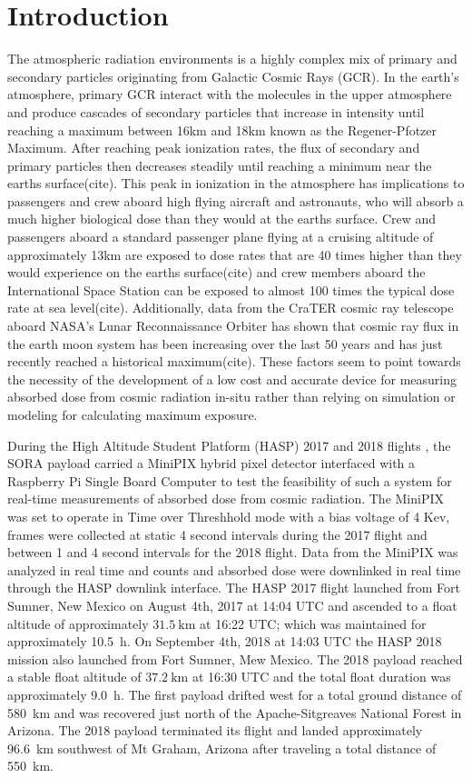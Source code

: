 \section{Introduction}
\label{Introduction}
The atmospheric radiation environments is a highly complex mix of primary and secondary particles originating from Galactic Cosmic Rays (GCR). In the earth’s atmosphere, primary GCR interact with the molecules in the upper atmosphere and produce cascades of secondary particles that increase in intensity until reaching a maximum between 16km and 18km known as the Regener-Pfotzer Maximum. After reaching peak ionization rates, the flux of secondary and primary particles then decreases steadily until reaching a minimum near the earths surface(cite). This peak in ionization in the atmosphere has implications to passengers and crew aboard high flying aircraft and astronauts, who will absorb a much higher biological dose than they would at the earths surface.  Crew and passengers aboard a standard passenger plane flying at a cruising altitude of approximately 13km are exposed to dose rates that are 40 times higher than they would experience on the earths surface(cite) and crew members aboard the International Space Station can be exposed to almost 100 times the typical dose rate at sea level(cite). Additionally, data from the CraTER cosmic ray telescope aboard NASA’s Lunar Reconnaissance Orbiter has shown that cosmic ray flux in the earth moon system has been increasing over the last 50 years and has just recently reached a historical maximum(cite). These factors seem to point towards the necessity of the development of a low cost and accurate device for measuring absorbed dose from cosmic radiation in-situ rather than relying on simulation or modeling for calculating maximum exposure. 

During the High Altitude Student Platform (HASP) 2017 and 2018 flights \cite{hasp}, the SORA payload carried a MiniPIX hybrid pixel detector interfaced with a Raspberry Pi Single Board Computer to test the feasibility of such a system for real-time measurements of absorbed dose from cosmic radiation. The MiniPIX was set to operate in Time over Threshhold mode with a bias voltage of 4 Kev, frames were collected at static 4 second intervals during the 2017 flight and between 1 and 4 second intervals for the 2018 flight. Data from the MiniPIX was analyzed in real time and counts and absorbed dose were downlinked in real time through the HASP downlink interface. 
The HASP 2017 flight launched from Fort Sumner, New Mexico on August 4th, 2017 at 14:04 UTC and ascended to a float altitude of approximately $\SI{31.5}{\kilo\meter}$ at 16:22 UTC; which was maintained for approximately \SI{10.5}{\hour}. On September 4th, 2018 at 14:03 UTC the HASP 2018 mission also launched from Fort Sumner, Mew Mexico.  The 2018 payload reached a stable float altitude of $\SI{37.2}{\kilo\meter}$ at 16:30 UTC and the total float duration was approximately \SI{9.0}{\hour}. The first payload drifted west for a total ground distance of \SI{580}{\kilo\meter} and was recovered just north of the Apache-Sitgreaves National Forest in Arizona. The 2018 payload terminated its flight and landed approximately \SI{96.6}{\kilo\meter} southwest of Mt Graham, Arizona after traveling a total distance of \SI{550}{\kilo\meter}.

